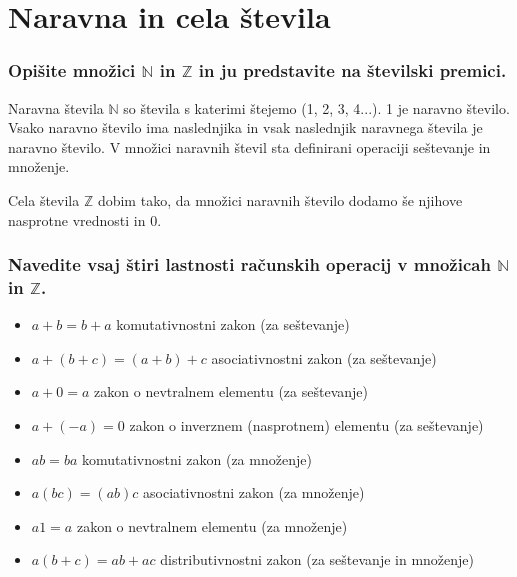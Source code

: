 \documentclass{article}
\begin{document}
\section{Naravna in cela števila}
\subsubsection*{Opišite množici $\mathbb{N}$ in $\mathbb{Z}$ in ju predstavite na številski premici.}

Naravna števila $\mathbb{N}$ so števila s katerimi štejemo (1, 2, 3, 4...). 1 je naravno število. Vsako naravno število ima naslednjika in vsak naslednjik naravnega števila je naravno število. V množici naravnih števil sta definirani operaciji seštevanje in množenje.

Cela števila $\mathbb{Z}$ dobim tako, da množici naravnih število dodamo še njihove nasprotne vrednosti in 0.
\begin{center}
\end{center}
\subsubsection*{Navedite vsaj štiri lastnosti računskih operacij v množicah $\mathbb{N}$ in $\mathbb{Z}$.}

\begin{itemize}
\item $a + b = b + a$ 	komutativnostni zakon (za seštevanje)
\item $a + (b + c) = (a + b) + c$ 	asociativnostni zakon (za seštevanje)
\item $a + 0 = a$ 	zakon o nevtralnem elementu (za seštevanje)
\item $a + ( -a ) = 0$ 	zakon o inverznem (nasprotnem) elementu (za seštevanje)
\item $a b = b a$ 	komutativnostni zakon (za množenje)
\item $a (b c) = (a b) c$ 	asociativnostni zakon (za množenje)
\item $a 1 = a$ 	zakon o nevtralnem elementu (za množenje)
\item $a (b + c) = a b + a c$ 	distributivnostni zakon (za seštevanje in množenje) 
\end{itemize}
\end{document}
